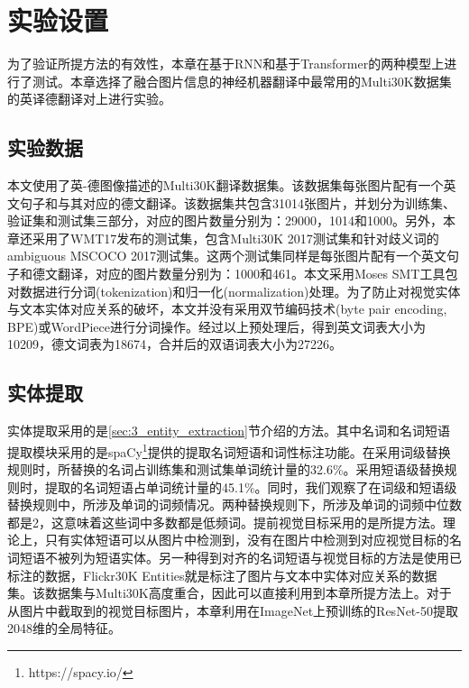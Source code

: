 \section{实验设置}
为了验证所提方法的有效性，本章在基于RNN和基于Transformer的两种模型上进行了测试。本章选择了融合图片信息的神经机器翻译中最常用的Multi30K\cite{43_elliott-etal-2016-multi30k}数据集的英译德翻译对上进行实验。

\subsection{实验数据}
本文使用了英-德图像描述的Multi30K翻译数据集。该数据集每张图片配有一个英文句子和与其对应的德文翻译。该数据集共包含31014张图片，并划分为训练集、验证集和测试集三部分，对应的图片数量分别为：29000，1014和1000。另外，本章还采用了WMT17发布的测试集，包含Multi30K 2017测试集和针对歧义词的ambiguous MSCOCO 2017测试集。这两个测试集同样是每张图片配有一个英文句子和德文翻译，对应的图片数量分别为：1000和461。本文采用Moses SMT\cite{44_koehn-etal-2007-moses}工具包对数据进行分词(tokenization)和归一化(normalization)处理。为了防止对视觉实体与文本实体对应关系的破坏，本文并没有采用双节编码技术\cite{27_sennrich-etal-2016-neural}(byte pair encoding, BPE)或WordPiece\cite{28_DBLP:journals/corr/WuSCLNMKCGMKSJL16}进行分词操作。经过以上预处理后，得到英文词表大小为10209，德文词表为18674，合并后的双语词表大小为27226。

\subsection{实体提取}
\label{sec:3_setup_entity_extraction}
实体提取采用的是\ref{sec:3_entity_extraction}节介绍的方法。其中名词和名词短语提取模块采用的是spaCy\footnote{https://spacy.io/}提供的提取名词短语和词性标注功能。在采用词级替换规则时，所替换的名词占训练集和测试集单词统计量的32.6\%。采用短语级替换规则时，提取的名词短语占单词统计量的45.1\%。同时，我们观察了在词级和短语级替换规则中，所涉及单词的词频情况。两种替换规则下，所涉及单词的词频中位数都是2，这意味着这些词中多数都是低频词。提前视觉目标采用的是\cite{24_DBLP:conf/iccv/YangGWHYL19}所提方法。理论上，只有实体短语可以从图片中检测到，没有在图片中检测到对应视觉目标的名词短语不被列为短语实体。另一种得到对齐的名词短语与视觉目标的方法是使用已标注的数据，Flickr30K Entities\cite{29_DBLP:conf/iccv/PlummerWCCHL15,30_DBLP:journals/ijcv/PlummerWCCHL17}就是标注了图片与文本中实体对应关系的数据集。该数据集与Multi30K高度重合，因此可以直接利用到本章所提方法上。对于从图片中截取到的视觉目标图片，本章利用在ImageNet\cite{31_DBLP:journals/ijcv/RussakovskyDSKS15}上预训练的ResNet-50\cite{32_DBLP:conf/cvpr/HeZRS16}提取2048维的全局特征。

